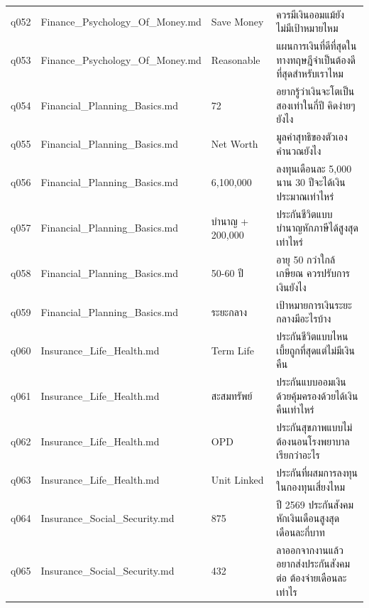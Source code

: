 \documentclass[11pt,a4paper]{article}
\begin{document}
{\begin{longtable}{lp{3.6cm}p{3.4cm}p{6.3cm}}
q052 & Finance\_\allowbreak{}Psychology\_\allowbreak{}Of\_\allowbreak{}Money.md & Save Money & {\thaifont ควรมีเงินออมแม้ยังไม่มีเป้าหมายไหม} \\
q053 & Finance\_\allowbreak{}Psychology\_\allowbreak{}Of\_\allowbreak{}Money.md & Reasonable & {\thaifont แผนการเงินที่ดีที่สุดในทางทฤษฎีจำเป็นต้องดีที่สุดสำหรับเราไหม} \\
q054 & Financial\_\allowbreak{}Planning\_\allowbreak{}Basics.md & 72 & {\thaifont อยากรู้ว่าเงินจะโตเป็นสองเท่าในกี่ปี คิดง่ายๆ ยังไง} \\
q055 & Financial\_\allowbreak{}Planning\_\allowbreak{}Basics.md & Net Worth & {\thaifont มูลค่าสุทธิของตัวเองคำนวณยังไง} \\
q056 & Financial\_\allowbreak{}Planning\_\allowbreak{}Basics.md & 6,100,000 & {\thaifont ลงทุนเดือนละ }5,000 {\thaifont นาน }30 {\thaifont ปีจะได้เงินประมาณเท่าไหร่} \\
q057 & Financial\_\allowbreak{}Planning\_\allowbreak{}Basics.md & {\thaifont บำนาญ }+ 200,000 & {\thaifont ประกันชีวิตแบบบำนาญหักภาษีได้สูงสุดเท่าไหร่} \\
q058 & Financial\_\allowbreak{}Planning\_\allowbreak{}Basics.md & 50-60 {\thaifont ปี} & {\thaifont อายุ }50 {\thaifont กว่าใกล้เกษียณ ควรปรับการเงินยังไง} \\
q059 & Financial\_\allowbreak{}Planning\_\allowbreak{}Basics.md & {\thaifont ระยะกลาง} & {\thaifont เป้าหมายการเงินระยะกลางมีอะไรบ้าง} \\
q060 & Insurance\_\allowbreak{}Life\_\allowbreak{}Health.md & Term Life & {\thaifont ประกันชีวิตแบบไหนเบี้ยถูกที่สุดแต่ไม่มีเงินคืน} \\
q061 & Insurance\_\allowbreak{}Life\_\allowbreak{}Health.md & {\thaifont สะสมทรัพย์} & {\thaifont ประกันแบบออมเงินด้วยคุ้มครองด้วยได้เงินคืนเท่าไหร่} \\
q062 & Insurance\_\allowbreak{}Life\_\allowbreak{}Health.md & OPD & {\thaifont ประกันสุขภาพแบบไม่ต้องนอนโรงพยาบาลเรียกว่าอะไร} \\
q063 & Insurance\_\allowbreak{}Life\_\allowbreak{}Health.md & Unit Linked & {\thaifont ประกันที่ผสมการลงทุนในกองทุนเสี่ยงไหม} \\
q064 & Insurance\_\allowbreak{}Social\_\allowbreak{}Security.md & 875 & {\thaifont ปี }2569 {\thaifont ประกันสังคมหักเงินเดือนสูงสุดเดือนละกี่บาท} \\
q065 & Insurance\_\allowbreak{}Social\_\allowbreak{}Security.md & 432 & {\thaifont ลาออกจากงานแล้วอยากส่งประกันสังคมต่อ ต้องจ่ายเดือนละเท่าไร} \\

\end{longtable}}
\end{document}
